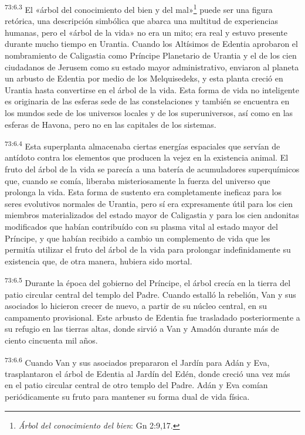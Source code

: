 \par
\textsuperscript{73:6.3} El «árbol del conocimiento del bien y del mal»\footnote{\textit{Árbol del conocimiento del bien}: Gn 2:9,17.} puede ser una figura retórica, una descripción simbólica que abarca una multitud de experiencias humanas, pero el «árbol de la vida» no era un mito; era real y estuvo presente durante mucho tiempo en Urantia. Cuando los Altísimos de Edentia aprobaron el nombramiento de Caligastia como Príncipe Planetario de Urantia y el de los cien ciudadanos de Jerusem como su estado mayor administrativo, enviaron al planeta un arbusto de Edentia por medio de los Melquisedeks, y esta planta creció en Urantia hasta convertirse en el árbol de la vida. Esta forma de vida no inteligente es originaria de las esferas sede de las constelaciones y también se encuentra en los mundos sede de los universos locales y de los superuniversos, así como en las esferas de Havona, pero no en las capitales de los sistemas.

\par
\textsuperscript{73:6.4} Esta superplanta almacenaba ciertas energías espaciales que servían de antídoto contra los elementos que producen la vejez en la existencia animal. El fruto del árbol de la vida se parecía a una batería de acumuladores superquímicos que, cuando se comía, liberaba misteriosamente la fuerza del universo que prolonga la vida. Esta forma de sustento era completamente ineficaz para los seres evolutivos normales de Urantia, pero sí era expresamente útil para los cien miembros materializados del estado mayor de Caligastia y para los cien andonitas modificados que habían contribuído con su plasma vital al estado mayor del Príncipe, y que habían recibido a cambio un complemento de vida que les permitía utilizar el fruto del árbol de la vida para prolongar indefinidamente su existencia que, de otra manera, hubiera sido mortal.

\par
\textsuperscript{73:6.5} Durante la época del gobierno del Príncipe, el árbol crecía en la tierra del patio circular central del templo del Padre. Cuando estalló la rebelión, Van y sus asociados lo hicieron crecer de nuevo, a partir de su núcleo central, en su campamento provisional. Este arbusto de Edentia fue trasladado posteriormente a su refugio en las tierras altas, donde sirvió a Van y Amadón durante más de ciento cincuenta mil años.

\par
\textsuperscript{73:6.6} Cuando Van y sus asociados prepararon el Jardín para Adán y Eva, trasplantaron el árbol de Edentia al Jardín del Edén, donde creció una vez más en el patio circular central de otro templo del Padre. Adán y Eva comían periódicamente su fruto para mantener su forma dual de vida física.

